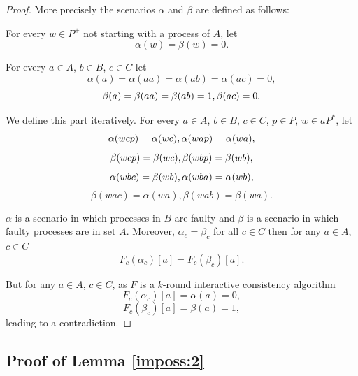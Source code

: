 \begin{proof}
More precisely  the scenarios $\alpha$
  and $\beta$ are defined as follows:
  \begin{enumerateroman}
    \item For every $w \in P^{+}$ not starting with a process of $A$, let
    \[ \alpha ( w ) = \beta ( w ) =0. \]
    \item For every $a \in A$, $b \in B$, $c \in C$ let
    \[ \alpha ( a ) = \alpha ( a a )  =  \alpha ( a b ) = \alpha ( a c )  = 0,
    \]
    \[ \beta ( a ) = \beta ( a a ) = \beta ( a b ) =1  , \beta ( a c )
       =0. \]
    \item We define this part iteratively. 
    For every $a \in A$, $b \in B$, $c \in C$, $p \in P$, $w \in
    a P^{\ast}$, let
    \[ \alpha ( w c p ) = \alpha ( w c )  , \alpha ( w a p ) = \alpha
       ( w a ) , \]
    \[ \beta ( w c p ) = \beta ( w c )  , \beta ( w b p ) = \beta ( w
       b ) , \]
    \[ \alpha ( w b c ) = \beta ( w b )  , \alpha ( w b a ) = \alpha
       ( w b ) , \]
    \[ \beta ( w a c ) = \alpha ( w a ) , \beta ( w a b )  =  \beta ( w a )
       . \]
  \end{enumerateroman}
  $\alpha$ is a  scenario in which processes in $B$ are faulty 
and  $\beta$ is a  scenario in which  faulty 
  processes are in set $A$. 
 Moreover,  $\alpha_{c} =
  \beta_{c}$ for all $c \in C$ then for any $a \in A$, $c \in C$
   \[ F_c ( \alpha_{c} )[a] = F_c ( \beta_{c} )[a].  \]

But for any $a \in A$, $c \in C$, as $F$ is a $k$-round  interactive consistency algorithm
    \[ F_c ( \alpha_{c})[a] = \alpha ( a ) = 0 , \] 
  \[ F_c ( \beta_{c} )[a] = \beta ( a ) =1 , \]
leading to a contradiction.
\end{proof}

\subsection{Proof of Lemma \ref{imposs:2}}\label{app:imposs:2}

